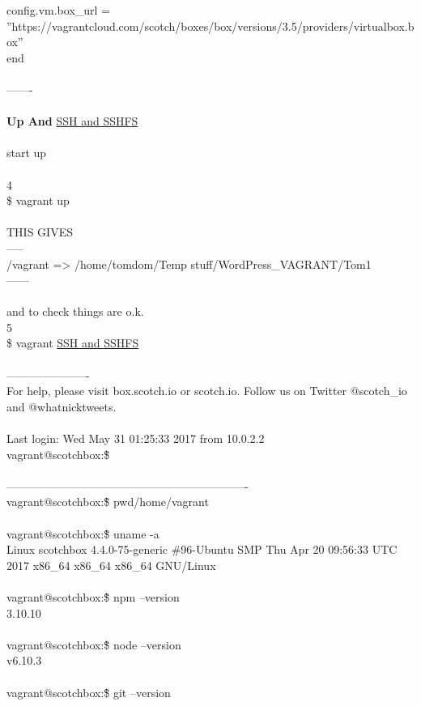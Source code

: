 \documentclass[10pt,a4paper]{article}
\begin{document}
{{{{{{{{{{{{{{{{{{{{{{{{  config.vm.box\_url = ''https://vagrantcloud.com/scotch/boxes/box/versions/3.5/providers/virtualbox.box''\\
end\\
\\
-------\\
\\
\textbf{Up And }\hyperlink{ssh___and_sshfs}{SSH   and SSHFS}\\
\\
start up\\
\\
4\\
\$ vagrant up\\
\\
THIS GIVES\\
-----\\
/vagrant => /home/tomdom/Temp stuff/WordPress\_VAGRANT/Tom1\\
------\\
\\
and to check things are o.k.\\
5\\
\$ vagrant \hyperlink{ssh___and_sshfs}{SSH   and SSHFS}\\
\\
----------------------\\
For help, please visit box.scotch.io or scotch.io. Follow us on Twitter @scotch\_io and @whatnicktweets.\\
\\
Last login: Wed May 31 01:25:33 2017 from 10.0.2.2\\
vagrant@scotchbox:\~\$\\
\\
----------------------------------------------------------------\\
vagrant@scotchbox:\~\$ pwd/home/vagrant\\
\\
vagrant@scotchbox:\~\$ uname -a\\
Linux scotchbox 4.4.0-75-generic \#96-Ubuntu SMP Thu Apr 20 09:56:33 UTC 2017 x86\_64 x86\_64 x86\_64 GNU/Linux\\
\\
vagrant@scotchbox:\~\$ npm --version\\
3.10.10\\
\\
vagrant@scotchbox:\~\$ node --version\\
v6.10.3\\
\\
vagrant@scotchbox:\~\$ git --version\\
}}}}}}}}}}}}}}}}}}}}}}}}
\end{document}
